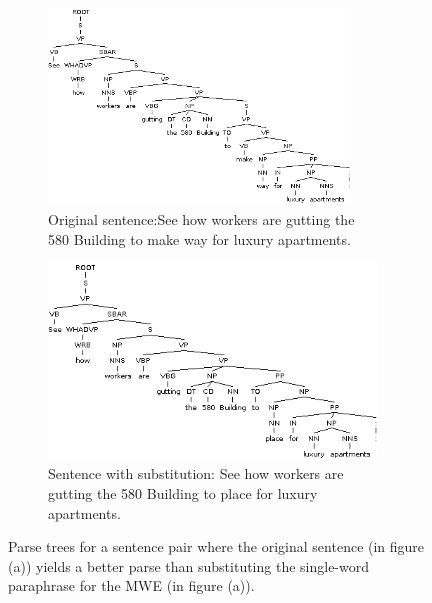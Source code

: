 \documentclass[11pt]{article}
\begin{document}
\begin{itemize}
\begin{figure}
\centering
\begin{subfigure}{.5\textwidth}
  \centering
  \includegraphics[width=80mm]{figs/make_way_tree.png}
  \caption{Original sentence:See how workers are gutting the \\
 580 Building to make way for luxury apartments.}
  \label{fig:sub1}
\end{subfigure}%
\begin{subfigure}{.5\textwidth}
  \centering
  \includegraphics[width=87mm]{figs/place_tree.png}
  \caption{Sentence with substitution: See how workers are gutting the 580 Building to place for luxury apartments.}
  \label{fig:sub2}
\end{subfigure}
\caption{Parse trees for a sentence pair where the original sentence (in figure (a)) yields a better parse than substituting the single-word paraphrase for the MWE (in figure (a)).}
\label{place}
\end{figure}

%
%
% 
% 


\end{itemize}
\end{document}
